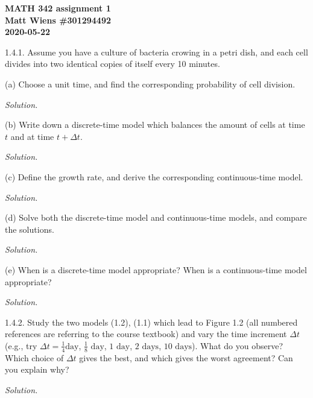 \documentclass{article}
\begin{document}
\textbf{MATH 342 assignment 1} \\
\textbf{Matt Wiens \#301294492} \\
\textbf{2020-05-22}

1.4.1. Assume you have a culture of bacteria crowing in a petri dish,
and each cell divides into two identical copies of itself every 10
minutes.

(a) Choose a unit time, and find the corresponding probability of cell division.

\textit{Solution.}

\newpage

(b) Write down a discrete-time model which balances the amount of cells
at time $t$ and at time $t + \Delta t$.

\textit{Solution.}

\newpage

(c) Define the growth rate, and derive the corresponding continuous-time model.

\textit{Solution.}

\newpage

(d) Solve both the discrete-time model and continuous-time models, and
compare the solutions.

\textit{Solution.}

\newpage

(e) When is a discrete-time model appropriate? When is a continuous-time
model appropriate?

\textit{Solution.}

\newpage

1.4.2. Study the two models (1.2), (1.1) which lead to Figure 1.2 (all
  numbered references are referring to the course textbook) and vary the
  time increment $\Delta t$ (e.g., try $\Delta t = \frac{1}{4} \text{
  day}$, $\frac{1}{8} \text{ day}$, $1 \text{ day}$, $2 \text{ days}$,
  $10 \text{ days}$). What do you observe? Which choice of $\Delta t$
  gives the best, and which gives the worst agreement? Can you explain
  why?

\textit{Solution.}
\end{document}
